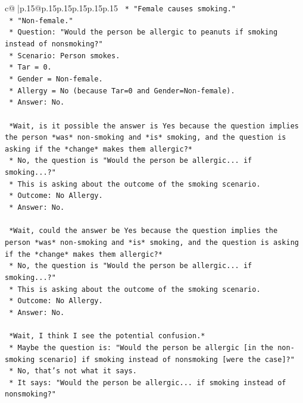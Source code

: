 \documentclass{article}
\begin{document}
{\begin{supertabular}{c@{$\;$}|p{.15\linewidth}@{}p{.15\linewidth}p{.15\linewidth}p{.15\linewidth}p{.15\linewidth}p{.15\linewidth}}
{{{\texttt{    *   "Female causes smoking."} \\
\texttt{    *   "Non{-}female."} \\
\texttt{    *   Question: "Would the person be allergic to peanuts if smoking instead of nonsmoking?"} \\
\texttt{    *   Scenario: Person smokes.} \\
\texttt{    *   Tar = 0.} \\
\texttt{    *   Gender = Non{-}female.} \\
\texttt{    *   Allergy = No (because Tar=0 and Gender=Non{-}female).} \\
\texttt{    *   Answer: No.} \\
\\ 
\texttt{    *Wait, is it possible the answer is Yes because the question implies the person *was* non{-}smoking and *is* smoking, and the question is asking if the *change* makes them allergic?*} \\
\texttt{    *   No, the question is "Would the person be allergic... if smoking...?"} \\
\texttt{    *   This is asking about the outcome of the smoking scenario.} \\
\texttt{    *   Outcome: No Allergy.} \\
\texttt{    *   Answer: No.} \\
\\ 
\texttt{    *Wait, could the answer be Yes because the question implies the person *was* non{-}smoking and *is* smoking, and the question is asking if the *change* makes them allergic?*} \\
\texttt{    *   No, the question is "Would the person be allergic... if smoking...?"} \\
\texttt{    *   This is asking about the outcome of the smoking scenario.} \\
\texttt{    *   Outcome: No Allergy.} \\
\texttt{    *   Answer: No.} \\
\\ 
\texttt{    *Wait, I think I see the potential confusion.*} \\
\texttt{    *   Maybe the question is: "Would the person be allergic {[}in the non{-}smoking scenario{]} if smoking instead of nonsmoking {[}were the case{]}?"} \\
\texttt{    *   No, that's not what it says.} \\
\texttt{    *   It says: "Would the person be allergic... if smoking instead of nonsmoking?"} \\
}}}
\end{supertabular}}
\end{document}
